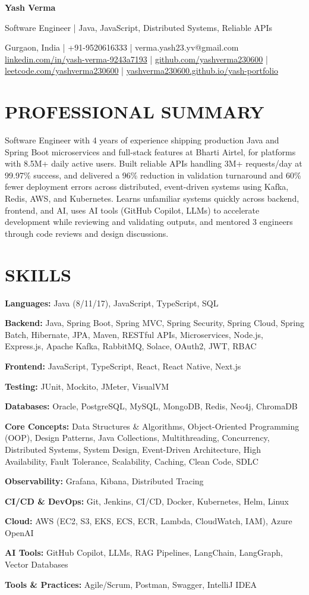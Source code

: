 \documentclass[10.5pt,a4paper]{article}
\newcommand{\skill}[2]{\textbf{#1:} #2\par\vspace{1pt}}
\begin{document}
{\color{navy}\bfseries\fontsize{22}{24}\selectfont Yash Verma}\par\vspace{3pt}
{\color{greytxt}\large Software Engineer | Java, JavaScript, Distributed Systems, Reliable APIs}\par\vspace{3pt}
{\color{greytxt}\small Gurgaon, India | +91-9520616333 | verma.yash23.yv@gmail.com\\
\href{https://www.linkedin.com/in/yash-verma-9243a7193/}{linkedin.com/in/yash-verma-9243a7193} | \href{https://github.com/yashverma230600}{github.com/yashverma230600} | \href{https://leetcode.com/yashverma230600}{leetcode.com/yashverma230600} | \href{https://yashverma230600.github.io/yash-portfolio/}{yashverma230600.github.io/yash-portfolio}}\par
\vspace{3pt}{\color{greytxt}\rule{\linewidth}{0.6pt}}

\section{PROFESSIONAL SUMMARY}
Software Engineer with 4 years of experience shipping production Java and Spring Boot microservices and full-stack features at Bharti Airtel, for platforms with 8.5M+ daily active users. Built reliable APIs handling 3M+ requests/day at 99.97\% success, and delivered a 96\% reduction in validation turnaround and 60\% fewer deployment errors across distributed, event-driven systems using Kafka, Redis, AWS, and Kubernetes. Learns unfamiliar systems quickly across backend, frontend, and AI, uses AI tools (GitHub Copilot, LLMs) to accelerate development while reviewing and validating outputs, and mentored 3 engineers through code reviews and design discussions.

\section{SKILLS}
\skill{Languages}{Java (8/11/17), JavaScript, TypeScript, SQL}
\skill{Backend}{Java, Spring Boot, Spring MVC, Spring Security, Spring Cloud, Spring Batch, Hibernate, JPA, Maven, RESTful APIs, Microservices, Node.js, Express.js, Apache Kafka, RabbitMQ, Solace, OAuth2, JWT, RBAC}
\skill{Frontend}{JavaScript, TypeScript, React, React Native, Next.js}
\skill{Testing}{JUnit, Mockito, JMeter, VisualVM}
\skill{Databases}{Oracle, PostgreSQL, MySQL, MongoDB, Redis, Neo4j, ChromaDB}
\skill{Core Concepts}{Data Structures \& Algorithms, Object-Oriented Programming (OOP), Design Patterns, Java Collections, Multithreading, Concurrency, Distributed Systems, System Design, Event-Driven Architecture, High Availability, Fault Tolerance, Scalability, Caching, Clean Code, SDLC}
\skill{Observability}{Grafana, Kibana, Distributed Tracing}
\skill{CI/CD \& DevOps}{Git, Jenkins, CI/CD, Docker, Kubernetes, Helm, Linux}
\skill{Cloud}{AWS (EC2, S3, EKS, ECS, ECR, Lambda, CloudWatch, IAM), Azure OpenAI}
\skill{AI Tools}{GitHub Copilot, LLMs, RAG Pipelines, LangChain, LangGraph, Vector Databases}
\skill{Tools \& Practices}{Agile/Scrum, Postman, Swagger, IntelliJ IDEA}
\end{document}
